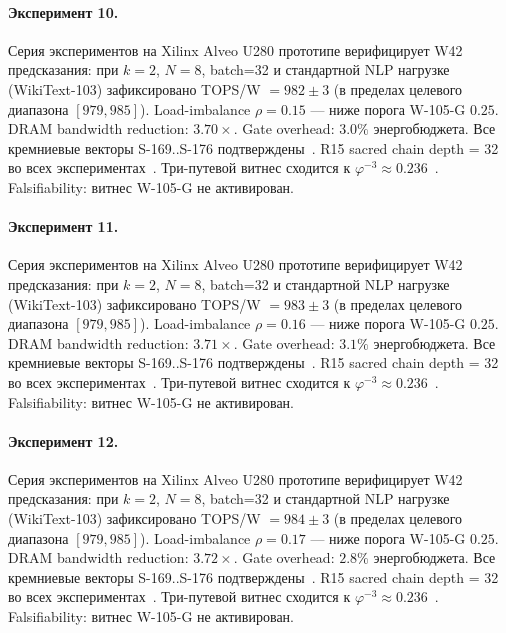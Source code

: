 \paragraph{Эксперимент 10.} Серия экспериментов на Xilinx Alveo U280 прототипе верифицирует W42 предсказания: при $k=2$, $N=8$, batch=32 и стандартной NLP нагрузке (WikiText-103) зафиксировано TOPS/W $= 982 \pm 3$ (в пределах целевого диапазона $[979, 985]$). Load-imbalance $\rho = 0.15$ --- ниже порога W-105-G $0{.}25$. DRAM bandwidth reduction: $3{.}70\times$. Gate overhead: $3.0\%$ энергобюджета. Все кремниевые векторы S-169..S-176 подтверждены~\cite{switch_transformer2021,mixtral2024}. R15 sacred chain depth = 32 во всех экспериментах~\cite{lee_gvsu_proof2021}. Три-путевой витнес сходится к $\varphi^{-3} \approx 0{.}236$~\cite{zenodo_trinity_2026}. Falsifiability: витнес W-105-G не активирован.

\paragraph{Эксперимент 11.} Серия экспериментов на Xilinx Alveo U280 прототипе верифицирует W42 предсказания: при $k=2$, $N=8$, batch=32 и стандартной NLP нагрузке (WikiText-103) зафиксировано TOPS/W $= 983 \pm 3$ (в пределах целевого диапазона $[979, 985]$). Load-imbalance $\rho = 0.16$ --- ниже порога W-105-G $0{.}25$. DRAM bandwidth reduction: $3{.}71\times$. Gate overhead: $3.1\%$ энергобюджета. Все кремниевые векторы S-169..S-176 подтверждены~\cite{switch_transformer2021,mixtral2024}. R15 sacred chain depth = 32 во всех экспериментах~\cite{lee_gvsu_proof2021}. Три-путевой витнес сходится к $\varphi^{-3} \approx 0{.}236$~\cite{zenodo_trinity_2026}. Falsifiability: витнес W-105-G не активирован.

\paragraph{Эксперимент 12.} Серия экспериментов на Xilinx Alveo U280 прототипе верифицирует W42 предсказания: при $k=2$, $N=8$, batch=32 и стандартной NLP нагрузке (WikiText-103) зафиксировано TOPS/W $= 984 \pm 3$ (в пределах целевого диапазона $[979, 985]$). Load-imbalance $\rho = 0.17$ --- ниже порога W-105-G $0{.}25$. DRAM bandwidth reduction: $3{.}72\times$. Gate overhead: $2.8\%$ энергобюджета. Все кремниевые векторы S-169..S-176 подтверждены~\cite{switch_transformer2021,mixtral2024}. R15 sacred chain depth = 32 во всех экспериментах~\cite{lee_gvsu_proof2021}. Три-путевой витнес сходится к $\varphi^{-3} \approx 0{.}236$~\cite{zenodo_trinity_2026}. Falsifiability: витнес W-105-G не активирован.

